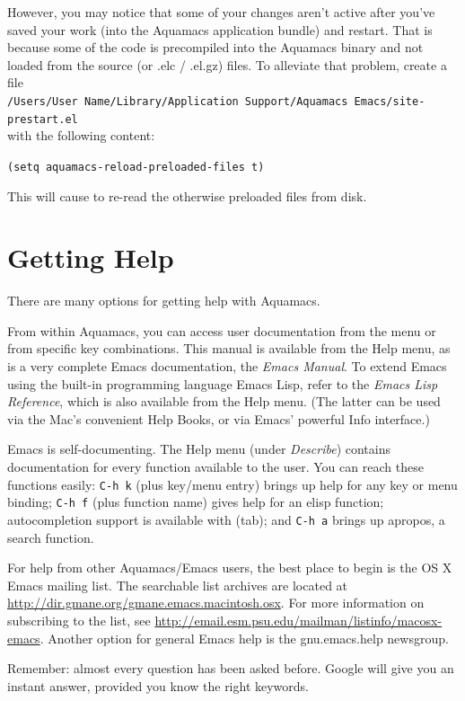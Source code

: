 \documentclass[11pt,letterpaper]{article}
\newcommand{\ttfile}{\tt}
\begin{document}
However, you may notice that some of your changes aren't active after you've saved your work (into the Aquamacs application bundle) and restart. That is because some of the code is precompiled into the Aquamacs binary and not loaded from the source (or .elc / .el.gz) files. To alleviate that problem, create a
file\\
{\ttfile /Users/User Name/Library/Application Support/Aquamacs Emacs/site-prestart.el} \\ with the following content:

\texttt{(setq aquamacs-reload-preloaded-files t)}

This will cause to re-read the otherwise preloaded files from disk.

\section{Getting Help}

There are many options for getting help with Aquamacs.

From within Aquamacs, you can access user documentation from the menu or from specific key combinations.  This manual is available from the Help menu, as is a very complete Emacs documentation, the \emph{Emacs Manual}.  To extend Emacs using the built-in programming language Emacs Lisp, refer to the \emph{Emacs Lisp Reference}, which is also available from the Help menu.  (The latter can be used via the Mac's convenient Help Books, or via Emacs' powerful Info interface.)

Emacs is self-documenting.  The Help menu (under \emph{Describe}) contains documentation for every function available to the user.  You can reach these functions easily: {\tt C-h k} (plus key/menu entry) brings up help for any key or menu binding; {\tt C-h f} (plus function name) gives help for an elisp function; autocompletion support is available with (tab); and {\tt C-h a} brings up apropos, a search function.

For help from other Aquamacs/Emacs users, the best place to begin is the OS X Emacs mailing list. The searchable list archives are located at \url{http://dir.gmane.org/gmane.emacs.macintosh.osx}. For more information on subscribing to the list, see \url{http://email.esm.psu.edu/mailman/listinfo/macosx-emacs}.  Another option for general Emacs help is the gnu.emacs.help newsgroup.

Remember: almost every question has been asked before.  Google will give you an instant answer, provided you know the right keywords.
\end{document}
